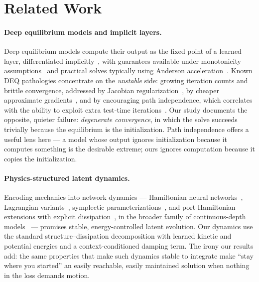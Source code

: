 \documentclass[11pt]{article}
\begin{document}
\section{Related Work}\label{sec:related}
\paragraph{Deep equilibrium models and implicit layers.}
Deep equilibrium models compute their output as the fixed point of a
learned layer, differentiated implicitly~\citep{bai2019deep,
bai2020multiscale, elghaoui2021implicit}, with guarantees available
under monotonicity assumptions~\citep{winston2020monotone} and
practical solves typically using Anderson
acceleration~\citep{anderson1965}. Known DEQ pathologies concentrate
on the \emph{unstable} side: growing iteration counts and brittle
convergence, addressed by Jacobian
regularization~\citep{bai2021stabilizing}, by cheaper approximate
gradients~\citep{fung2022jfb}, and by encouraging path
independence, which correlates with the ability to exploit extra
test-time iterations~\citep{anil2022path}. Our study documents the
opposite, quieter failure: \emph{degenerate convergence}, in which the
solve succeeds trivially because the equilibrium is the
initialization. Path independence offers a useful lens here --- a model
whose output ignores initialization because it computes something is
the desirable extreme; ours ignores computation because it copies the
initialization.

\paragraph{Physics-structured latent dynamics.}
Encoding mechanics into network dynamics --- Hamiltonian neural
networks~\citep{greydanus2019hamiltonian}, Lagrangian
variants~\citep{cranmer2020lagrangian}, symplectic
parameterizations~\citep{jin2020sympnets}, and port-Hamiltonian
extensions with explicit dissipation~\citep{desai2021port}, in the
broader family of continuous-depth models~\citep{chen2018neural} ---
promises stable, energy-controlled latent evolution. Our dynamics use
the standard structure--dissipation decomposition with learned kinetic
and potential energies and a context-conditioned damping term. The
irony our results add: the same properties that make such dynamics
stable to integrate make ``stay where you started'' an easily
reachable, easily maintained solution when nothing in the loss demands
motion.
\end{document}
